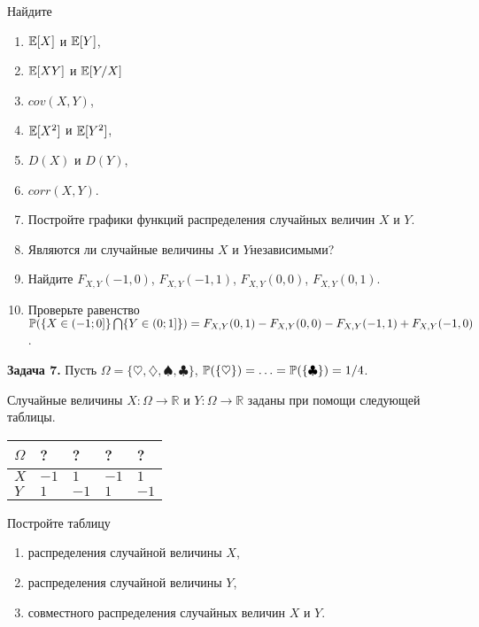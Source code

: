 Найдите

\begin{enumerate}
\item  ${\rm {\mathbb E}}[X]$ и ${\rm {\mathbb E}}[Y]$,

\item  ${\rm {\mathbb E}}[XY]$ и ${\rm {\mathbb E}}[Y/X]$

\item  $cov(X,Y)$,

\item  ${\rm {\mathbb E}}[X^{2} ]$ и ${\rm {\mathbb E}}[Y^{2} ]$,

\item  $D(X)$ и $D(Y)$,

\item  $corr(X,Y)$.

\item  Постройте графики функций распределения случайных величин $X$ и $Y$. 

\item  Являются ли случайные величины  $X$ и $Y$независимыми?

\item  Найдите $F_{X,Y} (-1,0)$, $F_{X,Y} (-1,1)$, $F_{X,Y} (0,0)$, $F_{X,Y} (0,1)$.

\item  Проверьте равенство ${\rm {\mathbb P}}(\{ X\in (-1;0]\} \bigcap \{ Y\in (0;1]\} )=F_{X,Y} (0,1)-F_{X,Y} (0,0)-F_{X,Y} (-1,1)+F_{X,Y} (-1,0)$.
\end{enumerate}

\textbf{Задача 7.} Пусть $\Omega =\{ \heartsuit ,\diamondsuit ,\spadesuit ,\clubsuit \} $, ${\rm {\mathbb P}}(\{ \heartsuit \} )=\ldots ={\rm {\mathbb P}}(\{ \clubsuit \} )=1/4$.

Случайные величины $X:\Omega \to {\mathbb R}$ и $Y:\Omega \to {\mathbb R}$ заданы при помощи следующей таблицы.

\begin{tabular}{|p{0.3in}|p{0.3in}|p{0.3in}|p{0.3in}|p{0.3in}|} \hline 
$\Omega $ & ? & ? & ? & ? \\ \hline 
$X$ & $-1$ & $1$ & $-1$ & $1$ \\ \hline 
$Y$ & $1$ & $-1$ & $1$ & $-1$ \\ \hline 
\end{tabular}

Постройте таблицу 

\begin{enumerate}
\item  распределения случайной величины $X$,

\item  распределения случайной величины $Y$,

\item  совместного распределения случайных величин $X$ и $Y$.
\end{enumerate}

